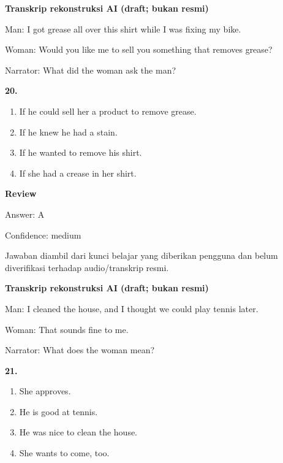 \documentclass[12pt]{article}
\begin{document}
\begin{exampleblock}
\textbf{Transkrip rekonstruksi AI (draft; bukan resmi)}\par
Man: I got grease all over this shirt while I was fixing my bike.\par
Woman: Would you like me to sell you something that removes grease?\par
Narrator: What did the woman ask the man?\par
\end{exampleblock}
\noindent\textbf{20.}
\begin{enumerate}[label=(\Alph*),leftmargin=*,itemsep=0.2em]
\item If he could sell her a product to remove grease.
\item If he knew he had a stain.
\item If he wanted to remove his shirt.
\item If she had a crease in her shirt.
\end{enumerate}
\par
\begingroup
\setlength{\parskip}{0pt}
\setlength{\parindent}{0pt}
\textbf{Review}\par
Answer: A\par
Confidence: medium\par
Jawaban diambil dari kunci belajar yang diberikan pengguna dan belum diverifikasi terhadap audio/transkrip resmi.\par
\endgroup
\par
\vspace{0.25\baselineskip}
\begin{exampleblock}
\textbf{Transkrip rekonstruksi AI (draft; bukan resmi)}\par
Man: I cleaned the house, and I thought we could play tennis later.\par
Woman: That sounds fine to me.\par
Narrator: What does the woman mean?\par
\end{exampleblock}
\noindent\textbf{21.}
\begin{enumerate}[label=(\Alph*),leftmargin=*,itemsep=0.2em]
\item She approves.
\item He is good at tennis.
\item He was nice to clean the house.
\item She wants to come, too.
\end{enumerate}
\par
\begingroup
\end{document}
